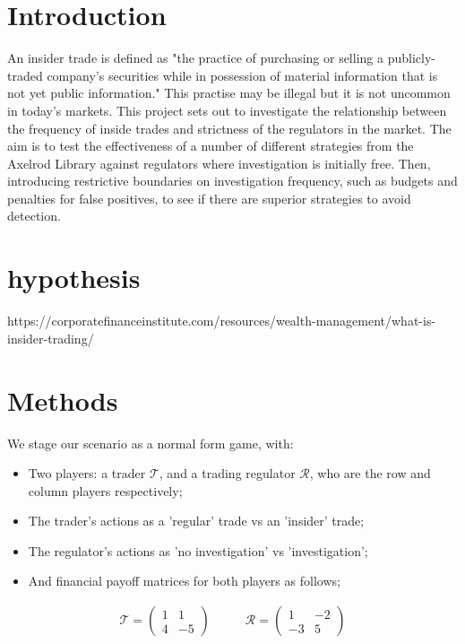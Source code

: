 \documentclass{article}
\begin{document}
\section{Introduction}
 An insider trade is defined as "the practice of purchasing or selling a publicly-traded company’s securities while in possession of material information that is not yet public information." This practise may be illegal but it is not uncommon in today's markets. This project sets out to investigate the relationship between the frequency of inside trades and strictness of the regulators in the market. The aim is to test the effectiveness of a number of different strategies from the Axelrod Library against regulators where investigation is initially free. Then, introducing restrictive boundaries on investigation frequency, such as budgets and penalties for false positives, to see if there are superior strategies to avoid detection.
 \section{hypothesis}
https://corporatefinanceinstitute.com/resources/wealth-management/what-is-insider-trading/

\section{Methods}

We stage our scenario as a normal form game, with:
\begin{itemize}
\item Two players: a trader $\mathcal{T}$, and a trading regulator $\mathcal{R}$, who are the row and column players respectively;
\item The trader's actions as a 'regular' trade vs an 'insider' trade;
\item The regulator's actions as 'no investigation' vs 'investigation';
\item And financial payoff matrices for both players as follows;
\end{itemize}
\begin{equation*}
\begin{split}
    \mathcal{T} = 
    \begin{pmatrix}
    1 & 1 \\
    4 & -5
    \end{pmatrix}
\end{split}
\quad\quad
\begin{split}
    \mathcal{R} = 
    \begin{pmatrix}
    1 & -2 \\
    -3 & 5
    \end{pmatrix}
\end{split}
\end{equation*}
\end{document}
